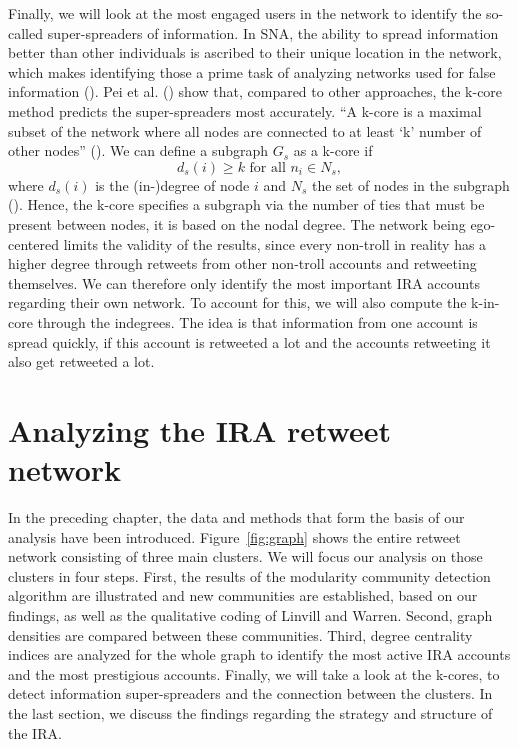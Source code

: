 \documentclass[12pt, titlepage=true, toc=bib]{scrartcl}
\begin{document}
Finally, we will look at the most engaged users in the network to identify the so-called super-spreaders of information. In SNA, the ability to spread information better than other individuals is ascribed to their unique location in the network, which makes identifying those a prime task of analyzing networks used for false information (\cite[1]{pei_searching_2015}). Pei et al. (\cite*{pei_searching_2015}) show that, compared to other approaches, the k-core method predicts the super-spreaders most accurately. \enquote{A k-core is a maximal subset of the network where all nodes are connected to at least \enquote{k} number of other nodes} (\cite[983]{golovchenko_state_2018}). We can define a subgraph \( G_{s} \) as a k-core if \[ d_{s}(i) \geq k \text{ for all } n_{i} \in N_{s} ,\] where \( d_{s}(i) \) is the (in-)degree of node \( i \) and \( N_{s} \) the set of nodes in the subgraph (\cite[266]{wasserman_social_1994}). Hence, the k-core specifies a subgraph via the number of ties that must be present between nodes, it is based on the nodal degree. The network being ego-centered limits the validity of the results, since every non-troll in reality has a higher degree through retweets from other non-troll accounts and retweeting themselves. We can therefore only identify the most important IRA accounts regarding their own network. To account for this, we will also compute the k-in-core through the indegrees. The idea is that information from one account is spread quickly, if this account is retweeted a lot and the accounts retweeting it also get retweeted a lot.


\section{Analyzing the IRA retweet network}

In the preceding chapter, the data and methods that form the basis of our analysis have been introduced. Figure~\ref{fig:graph} shows the entire retweet network consisting of three main clusters. We will focus our analysis on those clusters in four steps. First, the results of the modularity community detection algorithm are illustrated and new communities are established, based on our findings, as well as the qualitative coding of Linvill and Warren. Second, graph densities are compared between these communities. Third, degree centrality indices are analyzed for the whole graph to identify the most active IRA accounts and the most prestigious accounts. Finally, we will take a look at the k-cores, to detect information super-spreaders and the connection between the clusters. In the last section, we discuss the findings regarding the strategy and structure of the IRA.
\end{document}
